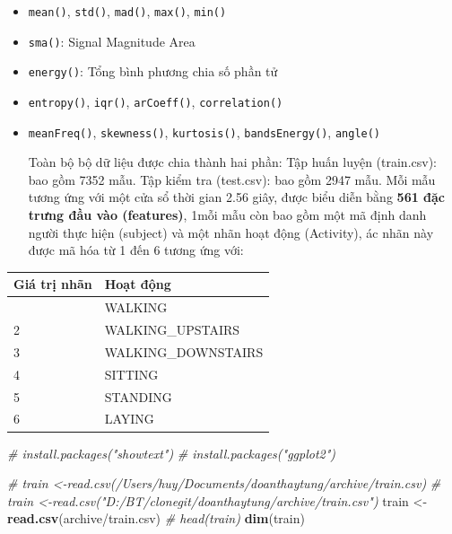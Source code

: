 \documentclass[
]{article}
\newenvironment{Shaded}{\begin{snugshade}}{\end{snugshade}}
\newcommand{\CommentTok}[1]{\textcolor[rgb]{0.56,0.35,0.01}{\textit{#1}}}
\newcommand{\FunctionTok}[1]{\textcolor[rgb]{0.13,0.29,0.53}{\textbf{#1}}}
\newcommand{\NormalTok}[1]{#1}
\newcommand{\OtherTok}[1]{\textcolor[rgb]{0.56,0.35,0.01}{#1}}
\newcommand{\StringTok}[1]{\textcolor[rgb]{0.31,0.60,0.02}{#1}}
\begin{document}
\begin{itemize}
\item
  \texttt{mean()}, \texttt{std()}, \texttt{mad()}, \texttt{max()},
  \texttt{min()}
\item
  \texttt{sma()}: Signal Magnitude Area
\item
  \texttt{energy()}: Tổng bình phương chia số phần tử
\item
  \texttt{entropy()}, \texttt{iqr()}, \texttt{arCoeff()},
  \texttt{correlation()}
\item
  \texttt{meanFreq()}, \texttt{skewness()}, \texttt{kurtosis()},
  \texttt{bandsEnergy()}, \texttt{angle()}

  Toàn bộ bộ dữ liệu được chia thành hai phần: Tập huấn luyện
  (train.csv): bao gồm 7352 mẫu. Tập kiểm tra (test.csv): bao gồm 2947
  mẫu. Mỗi mẫu tương ứng với một cửa sổ thời gian 2.56 giây, được biểu
  diễn bằng \textbf{561 đặc trưng đầu vào (features)}, 1mỗi mẫu còn bao
  gồm một mã định danh người thực hiện (subject) và một nhãn hoạt động
  (Activity), ác nhãn này được mã hóa từ 1 đến 6 tương ứng với:
\end{itemize}

\begin{longtable}[]{@{}ll@{}}
\toprule\noalign{}
Giá trị nhãn & Hoạt động \\
\midrule\noalign{}
\endhead
\bottomrule\noalign{}
\endlastfoot
1 & WALKING \\
2 & WALKING\_UPSTAIRS \\
3 & WALKING\_DOWNSTAIRS \\
4 & SITTING \\
5 & STANDING \\
6 & LAYING \\
\end{longtable}

\begin{Shaded}
\begin{Highlighting}[]
\CommentTok{\# install.packages("showtext")}
\CommentTok{\# install.packages("ggplot2")}
\end{Highlighting}
\end{Shaded}

\begin{Shaded}
\begin{Highlighting}[]
\CommentTok{\# train \textless{}{-}read.csv(\textquotesingle{}/Users/huy/Documents/doanthaytung/archive/train.csv\textquotesingle{})}
\CommentTok{\# train \textless{}{-}read.csv("D:/BT/clonegit/doanthaytung/archive/train.csv")}
\NormalTok{train }\OtherTok{\textless{}{-}} \FunctionTok{read.csv}\NormalTok{(}\StringTok{\textquotesingle{}archive/train.csv\textquotesingle{}}\NormalTok{)}
\CommentTok{\# head(train)}
\FunctionTok{dim}\NormalTok{(train)}
\end{Highlighting}
\end{Shaded}
\end{document}
